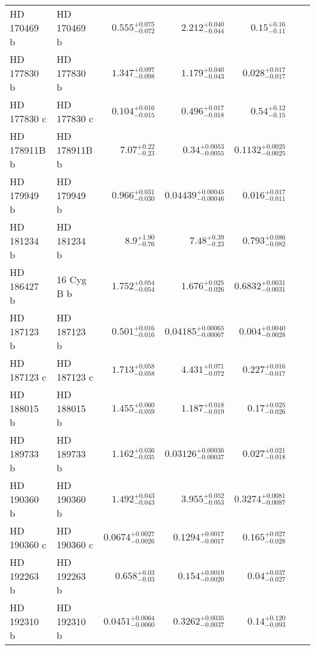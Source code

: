 \begin{longtable*}{llrrrrr}
HD 170469 b & HD 170469 b & $0.555^{+0.075}_{-0.072}$ & $2.212^{+0.040}_{-0.044}$ & $0.15^{+0.16}_{-0.11}$ & \cite{Fischer07} & \\
HD 177830 b & HD 177830 b & $1.347^{+0.097}_{-0.098}$ & $1.179^{+0.040}_{-0.043}$ & $0.028^{+0.017}_{-0.017}$ & \cite{Butler06} & \\
HD 177830 c & HD 177830 c & $0.104^{+0.016}_{-0.015}$ & $0.496^{+0.017}_{-0.018}$ & $0.54^{+0.12}_{-0.15}$ & \cite{Meschiari11} & \\
HD 178911B b & HD 178911B b & $7.07^{+0.22}_{-0.23}$ & $0.34^{+0.0053}_{-0.0055}$ & $0.1132^{+0.0025}_{-0.0025}$ & \cite{Zucker02} & \\
HD 179949 b & HD 179949 b & $0.966^{+0.031}_{-0.030}$ & $0.04439^{+0.00045}_{-0.00046}$ & $0.016^{+0.017}_{-0.011}$ & \cite{Tiney01} & \\
HD 181234 b & HD 181234 b & $8.9^{+1.90}_{-0.76}$ & $7.48^{+0.39}_{-0.23}$ & $0.793^{+0.086}_{-0.082}$ & \cite{Rickman19} & \\
HD 186427 b & 16 Cyg B b & $1.752^{+0.054}_{-0.054}$ & $1.676^{+0.025}_{-0.026}$ & $0.6832^{+0.0031}_{-0.0031}$ & \cite{Chochran97} & \\
HD 187123 b & HD 187123 b & $0.501^{+0.016}_{-0.016}$ & $0.04185^{+0.00065}_{-0.00067}$ & $0.004^{+0.0040}_{-0.0028}$ & \cite{Vogt00} & \\
HD 187123 c & HD 187123 c & $1.713^{+0.058}_{-0.058}$ & $4.431^{+0.071}_{-0.072}$ & $0.227^{+0.016}_{-0.017}$ & \cite{Wright09} & \\
HD 188015 b & HD 188015 b & $1.455^{+0.060}_{-0.059}$ & $1.187^{+0.018}_{-0.019}$ & $0.17^{+0.025}_{-0.026}$ & \cite{Marcy05} & \\
HD 189733 b & HD 189733 b & $1.162^{+0.036}_{-0.035}$ & $0.03126^{+0.00036}_{-0.00037}$ & $0.027^{+0.021}_{-0.018}$ & \cite{Bouchy05} & \\
HD 190360 b & HD 190360 b & $1.492^{+0.043}_{-0.043}$ & $3.955^{+0.052}_{-0.053}$ & $0.3274^{+0.0081}_{-0.0087}$ & \cite{Naef03} & \\
HD 190360 c & HD 190360 c & $0.0674^{+0.0027}_{-0.0026}$ & $0.1294^{+0.0017}_{-0.0017}$ & $0.165^{+0.027}_{-0.028}$ & \cite{Vogt05} & \\
HD 192263 b & HD 192263 b & $0.658^{+0.03}_{-0.03}$ & $0.154^{+0.0019}_{-0.0020}$ & $0.04^{+0.037}_{-0.027}$ & \cite{Santos00} & \\
HD 192310 b & HD 192310 b & $0.0451^{+0.0064}_{-0.0060}$ & $0.3262^{+0.0035}_{-0.0037}$ & $0.14^{+0.120}_{-0.093}$ & \cite{Howard11} & \\

\end{longtable*}
